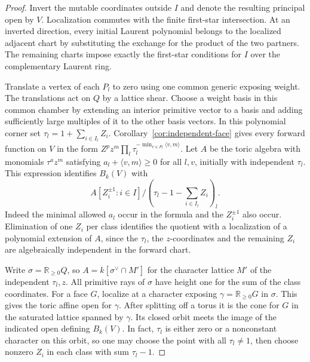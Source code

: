 \documentclass[11pt,reqno]{amsart}
\numberwithin{equation}{section}
\theoremstyle{definition}
\theoremstyle{remark}
\begin{document}
\begin{proof}
Invert the mutable coordinates outside \(I\) and denote the resulting
principal open by \(V\). Localization commutes with the finite
first-star intersection. At an inverted direction, every initial
Laurent polynomial belongs to the localized adjacent chart by
substituting the exchange for the product of the two partners.
The remaining charts impose exactly the first-star conditions for
\(I\) over the complementary Laurent ring.

Translate a vertex of each \(P_l\) to zero using one common generic
exposing weight. The translations act on \(Q\) by a lattice shear.
Choose a weight basis in this common chamber by extending an interior
primitive vector to a basis and adding sufficiently large multiples
of it to the other basis vectors. In this polynomial corner set
\(\tau_l=1+\sum_{i\in I_l}Z_i\). Corollary~\ref{cor:independent-face}
gives every forward function on \(V\) in the form
\(Z^p z^m\prod_l\tau_l^{-\min_{v\in P_l}\langle v,m\rangle}\).
Let \(A\) be the toric algebra with monomials \(\tau^a z^m\)
satisfying \(a_l+\langle v,m\rangle\ge0\) for all \(l,v\), initially
with independent \(\tau_l\). This expression identifies
\(B_k(V)\) with
\[ A[Z_i^{\pm1}:i\in I]\big/ (\tau_l-1-\textstyle\sum_{i\in I_l}Z_i)_l . \]
Indeed the minimal allowed \(a_l\) occur in the formula and the
\(Z_i^{\pm1}\) also occur. Elimination of one \(Z_i\) per class
identifies the quotient with a localization of a polynomial
extension of \(A\), since the \(\tau_l\), the \(z\)-coordinates and the remaining \(Z_i\)
are algebraically independent in the forward chart.

Write \(\sigma=\mathbb R_{\ge0}Q\), so \(A=k[\sigma^\vee\cap M']\) for the character lattice \(M'\) of the independent \(\tau_l,z\). All primitive rays of \(\sigma\) have height one for the sum of the class coordinates.
For a face \(G\), localize at a character exposing
\(\gamma=\mathbb R_{\ge0}G\) in \(\sigma\). This gives the toric
affine open for \(\gamma\). After splitting off a torus it is the
cone for \(G\) in the saturated lattice spanned by \(\gamma\).
Its closed orbit meets the image of the indicated open defining
\(B_k(V)\). In fact, \(\tau_l\) is either zero or a nonconstant
character on this orbit, so one may choose the point with all
\(\tau_l\ne1\), then choose nonzero \(Z_i\) in each class with
sum \(\tau_l-1\).


\end{proof}
\end{document}
